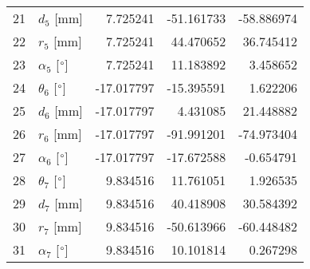 \documentclass{standalone}%
\begin{document}
\begin{tabular}{llrrr}
21 &              $d_{5}$ [mm] &   7.725241 &  -51.161733 &  -58.886974 \\
22 &              $r_{5}$ [mm] &   7.725241 &   44.470652 &   36.745412 \\
23 &  $\alpha_{5}$ [$\degree$] &   7.725241 &   11.183892 &    3.458652 \\
24 &  $\theta_{6}$ [$\degree$] & -17.017797 &  -15.395591 &    1.622206 \\
25 &              $d_{6}$ [mm] & -17.017797 &    4.431085 &   21.448882 \\
26 &              $r_{6}$ [mm] & -17.017797 &  -91.991201 &  -74.973404 \\
27 &  $\alpha_{6}$ [$\degree$] & -17.017797 &  -17.672588 &   -0.654791 \\
28 &  $\theta_{7}$ [$\degree$] &   9.834516 &   11.761051 &    1.926535 \\
29 &              $d_{7}$ [mm] &   9.834516 &   40.418908 &   30.584392 \\
30 &              $r_{7}$ [mm] &   9.834516 &  -50.613966 &  -60.448482 \\
31 &  $\alpha_{7}$ [$\degree$] &   9.834516 &   10.101814 &    0.267298 \\
\bottomrule
\end{tabular}
%
\end{document}
